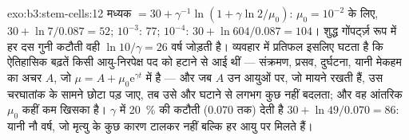 \begin{solution}{exo:b3:stem-cells:12}
मध्यक $= 30 + \gamma^{-1}\ln(1 + \gamma\ln 2/\mu_{0})$: $\mu_{0} =
10^{-2}$ के लिए, $30 + \ln 7/0.087 = 52$; $10^{-3}$: 77; $10^{-4}$: $30 +
\ln 604/0.087 = 104$। शुद्ध गोंपर्ट्ज़ रूप में हर दस गुनी कटौती वही
$\ln 10/\gamma = 26$ वर्ष जोड़ती है। व्यवहार में प्रतिफल इसलिए घटता है
कि ऐतिहासिक बढ़तें किसी आयु-निरपेक्ष पद को हटाने से आई थीं ---
संक्रमण, प्रसव, दुर्घटना, यानी मेकहम का अचर $A$, जो $\mu = A
+ \mu_{0}\mathrm{e}^{\gamma t}$ में है --- और जब $A$ उन
आयुओं पर, जो मायने रखती हैं, उस चरघातांक के सामने छोटा पड़ जाए, तब उसे
और घटाने से लगभग कुछ नहीं बदलता; और वह आंतरिक $\mu_{0}$ कहीं कम खिसका
है। $\gamma$ में \qty{20}{\%} की कटौती ($0.070$ तक) देती है
$30 + \ln 49/0.070 = 86$: यानी नौ वर्ष, जो मृत्यु के कुछ कारण टालकर
नहीं बल्कि हर आयु पर मिलते हैं।
\end{solution}

